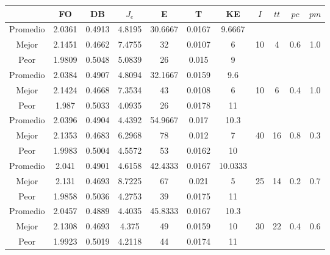 \begin{table}[h!]
    \footnotesize
    \begin{center}
        \begin{tabular}{|c|c|c|c|c|c|c|c|c|c|c|}
        \hline
             & {\bf FO} & {\bf DB} & $J_e$ & {\bf E} & {\bf T} & {\bf KE} & $I$ & $tt$ & $pc$ & $pm$ \\
        \hline
        \hline
            Promedio  & 2.0361 & 0.4913 & 4.8195 & 30.6667 & 0.0167 & 9.6667 &  &  &  & \\
            \cline{1-7}
            Mejor & 2.1451 & 0.4662  & 7.4755 & 32 & 0.0107 & 6 & 10 & 4 & 0.6 & 1.0\\
            \cline{1-7}
            Peor & 1.9809 & 0.5048  & 5.0839 & 26 & 0.015 & 9 &  &  &  & \\
        \hline
        \hline
            Promedio  & 2.0384 & 0.4907 & 4.8094 & 32.1667 & 0.0159 & 9.6 &  &  &  & \\
            \cline{1-7}
            Mejor & 2.1424 & 0.4668  & 7.3534 & 43 & 0.0108 & 6 & 10 & 6 & 0.4 & 1.0\\
            \cline{1-7}
            Peor & 1.987 & 0.5033  & 4.0935 & 26 & 0.0178 & 11 &  &  &  & \\
        \hline
        \hline
            Promedio  & 2.0396 & 0.4904 & 4.4392 & 54.9667 & 0.017 & 10.3 &  &  &  & \\
            \cline{1-7}
            Mejor & 2.1353 & 0.4683  & 6.2968 & 78 & 0.012 & 7 & 40 & 16 & 0.8 & 0.3\\
            \cline{1-7}
            Peor & 1.9983 & 0.5004  & 4.5572 & 53 & 0.0162 & 10 &  &  &  & \\
        \hline
        \hline
            Promedio  & 2.041 & 0.4901 & 4.6158 & 42.4333 & 0.0167 & 10.0333 &  &  &  & \\
            \cline{1-7}
            Mejor & 2.131 & 0.4693  & 8.7225 & 67 & 0.021 & 5 & 25 & 14 & 0.2 & 0.7\\
            \cline{1-7}
            Peor & 1.9858 & 0.5036  & 4.2753 & 39 & 0.0175 & 11 &  &  &  & \\
        \hline
        \hline
            Promedio  & 2.0457 & 0.4889 & 4.4035 & 45.8333 & 0.0167 & 10.3 &  &  &  & \\
            \cline{1-7}
            Mejor & 2.1308 & 0.4693  & 4.375 & 49 & 0.0159 & 10 & 30 & 22 & 0.4 & 0.6\\
            \cline{1-7}
            Peor & 1.9923 & 0.5019  & 4.2118 & 44 & 0.0174 & 11 &  &  &  & \\

\end{tabular}
\end{center}
\end{table}
